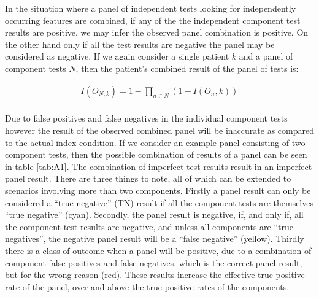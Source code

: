 \documentclass[a4paper, 12pt, twoside]{article}
\begin{document}
In the situation where a panel of independent tests looking for independently occurring features are combined, if any of the the independent component test results are positive, we may infer the observed panel combination is positive. On the other hand only if all the test results are negative the panel may be considered as negative. If we again consider a single patient $k$ and a panel of component tests $N$, then the patient's combined result of the panel of tests is:

\begin{equation*}
\begin{aligned}
I(O_{N,k}) = 1-\prod_{n \in N}{(1-I(O_n,k))} \\
\end{aligned}
\end{equation*}

Due to false positives and false negatives in the individual component tests however the result of the observed combined panel will be inaccurate as compared to the actual index condition. If we consider an example panel consisting of two component tests, then the possible combination of results of a panel can be seen in table \ref{tab:A1}. The combination of imperfect test results result in an imperfect panel result. There are three things to note, all of which can be extended to scenarios involving more than two components. Firstly a panel result can only be considered a ``true negative'' (TN) result if all the component tests are themselves ``true negative'' (cyan). Secondly, the panel result is negative, if, and only if, all the component test results are negative, and unless all components are ``true negatives'', the negative panel result will be a ``false negative'' (yellow). Thirdly there is a class of outcome when a panel will be positive, due to a combination of component false positives and false negatives, which is the correct panel result, but for the wrong reason (red). These results increase the effective true positive rate of the panel, over and above the true positive rates of the components.
\end{document}
